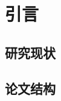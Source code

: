\documentclass[index]{subfiles}
\begin{document}
\chapter{引言}\label{sec:intro}
\section{研究现状}
\section{论文结构}
\end{document}
